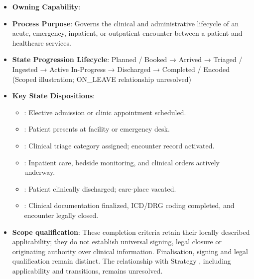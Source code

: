 \begin{itemize}

\item 
\textbf{Owning Capability}: \texttt{}



\item 
\textbf{Process Purpose}: Governs the clinical and administrative lifecycle of an acute, emergency, inpatient, or outpatient encounter between a patient and healthcare services.



\item 
\textbf{State Progression Lifecycle}: Planned /\allowbreak{} Booked → Arrived → Triaged /\allowbreak{} Ingested → Active In-Progress → Discharged → Completed /\allowbreak{} Encoded   (Scoped illustration; ON\_LEAVE relationship unresolved)



\item 
\textbf{Key State Dispositions}:


\begin{itemize}

\item 
\texttt{}: Elective admission or clinic appointment scheduled.



\item 
\texttt{}: Patient presents at facility or emergency desk.



\item 
\texttt{}: Clinical triage category assigned; encounter record activated.



\item 
\texttt{}: Inpatient care, bedside monitoring, and clinical orders actively underway.



\item 
\texttt{}: Patient clinically discharged; care-place vacated.



\item 
\texttt{}: Clinical documentation finalized, ICD/\allowbreak{}DRG coding completed, and encounter legally closed.



\end{itemize}


\item 
\textbf{Scope qualification}: These completion criteria retain their locally described applicability; they do not establish universal signing, legal closure or originating authority over clinical information. Finalisation, signing and legal qualification remain distinct. The relationship with Strategy \texttt{}, including applicability and transitions, remains unresolved.



\end{itemize}
\label{rad:processes:133}

